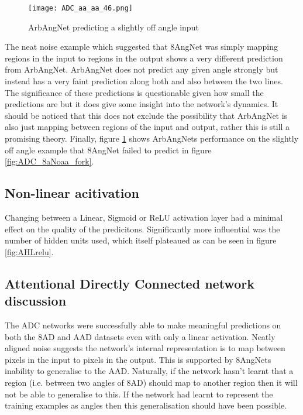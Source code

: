 \begin{figure}[h]
    \centering
    \texttt{[image: ADC\_aa\_aa\_46.png]}
    \caption{ArbAngNet predicting a slightly off angle input}
    \label{fig:ADC_aaaa_fork}
\end{figure}


The neat noise example which suggested that 8AngNet was simply mapping regions in the input to regions in the output shows a very different prediction from ArbAngNet.
ArbAngNet does not predict any given angle strongly but instead has a very faint prediction along both and also between the two lines. 
The significance of these predictions is questionable given how small the predictions are but it does give some insight into the network's dynamics.
It should be noticed that this does not exclude the possibility that ArbAngNet is also just mapping between regions of the input and output, rather this is still a promising theory.
Finally, figure \ref{fig:ADC_aaaa_fork} shows ArbAngNets performance on the slightly off angle example that 8AngNet failed to predict in figure \ref{fig:ADC_8aNoaa_fork}.

\subsection{Non-linear acitivation}
Changing between a Linear, Sigmoid or ReLU activation layer had a minimal effect on the quality of the predicitons.
Significantly more influential was the number of hidden units used, which itself plateaued as can be seen in figure \ref{fig:AHLrelu}.

\subsection{Attentional Directly Connected network discussion}
The ADC networks were successfully able to make meaningful predictions on both the 8AD and AAD datasets even with only a linear activation.
Neatly aligned noise suggests the network's internal representation is to map between pixels in the input to pixels in the output.
This is supported by 8AngNets inability to generalise to the AAD. 
Naturally, if the network hasn't learnt that a region (i.e. between two angles of 8AD) should map to another region then it will not be able to generalise to this. 
If the network had learnt to represent the training examples as angles then this generalisation should have been possible. 


